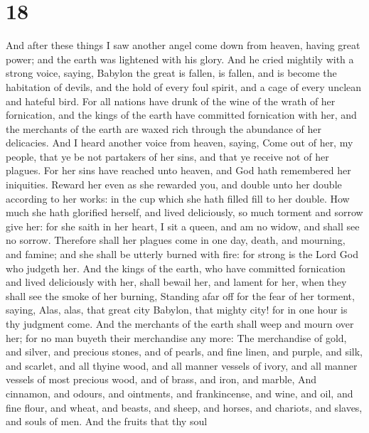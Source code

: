 \hypertarget{section-17}{%
\section{18}\label{section-17}}

 And after these things I saw another angel come down from
heaven, having great power; and the earth was lightened with his glory.
 And he cried mightily with a strong voice, saying, Babylon
the great is fallen, is fallen, and is become the habitation of devils,
and the hold of every foul spirit, and a cage of every unclean and
hateful bird.  For all nations have drunk of the wine of the
wrath of her fornication, and the kings of the earth have committed
fornication with her, and the merchants of the earth are waxed rich
through the abundance of her delicacies.  And I heard
another voice from heaven, saying, Come out of her, my people, that ye
be not partakers of her sins, and that ye receive not of her plagues.
 For her sins have reached unto heaven, and God hath
remembered her iniquities.  Reward her even as she rewarded
you, and double unto her double according to her works: in the cup which
she hath filled fill to her double.  How much she hath
glorified herself, and lived deliciously, so much torment and sorrow
give her: for she saith in her heart, I sit a queen, and am no widow,
and shall see no sorrow.  Therefore shall her plagues come
in one day, death, and mourning, and famine; and she shall be utterly
burned with fire: for strong is the Lord God who judgeth her.
 And the kings of the earth, who have committed fornication
and lived deliciously with her, shall bewail her, and lament for her,
when they shall see the smoke of her burning,  Standing
afar off for the fear of her torment, saying, Alas, alas, that great
city Babylon, that mighty city! for in one hour is thy judgment come.
 And the merchants of the earth shall weep and mourn over
her; for no man buyeth their merchandise any more:  The
merchandise of gold, and silver, and precious stones, and of pearls, and
fine linen, and purple, and silk, and scarlet, and all thyine wood, and
all manner vessels of ivory, and all manner vessels of most precious
wood, and of brass, and iron, and marble,  And cinnamon,
and odours, and ointments, and frankincense, and wine, and oil, and fine
flour, and wheat, and beasts, and sheep, and horses, and chariots, and
slaves, and souls of men.  And the fruits that thy soul
